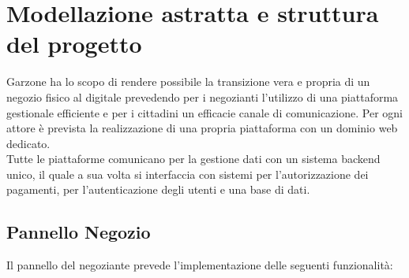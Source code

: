 \section{Modellazione astratta e struttura del progetto}
Garzone ha lo scopo di rendere possibile la transizione vera e propria di un negozio fisico al digitale prevedendo per i negozianti l'utilizzo di una piattaforma gestionale efficiente e per i cittadini un efficacie canale di comunicazione. Per ogni attore è prevista la realizzazione di una propria piattaforma con un dominio web dedicato. \\Tutte le piattaforme comunicano per la gestione dati con un sistema backend unico, il quale a sua volta si interfaccia con sistemi per l'autorizzazione dei pagamenti, per l'autenticazione degli utenti e una base di dati.
\subsection{Pannello Negozio}
Il pannello del negoziante prevede l'implementazione delle seguenti funzionalità:
